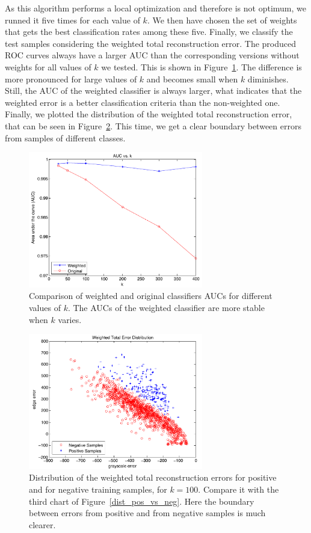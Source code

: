 \documentclass[10pt, conference, compsocconf]{IEEEtran}
\begin{document}
As this algorithm performs a local optimization and therefore is not optimum, we runned it five times for each value of $k$. We then have chosen the set of weights that gets the best classification rates among these five. Finally, we classify the test samples considering the weighted total reconstruction error. The produced ROC curves always have a larger AUC than the corresponding versions without weights for all values of $k$ we tested. This is shown in Figure~\ref{auc_vs_k}. The difference is more pronounced for large values of $k$ and becomes small when $k$ diminishes. Still, the AUC of the weighted classifier is always larger, what indicates that the weighted error is a better classification criteria than the non-weighted one. Finally, we plotted the distribution of the weighted total reconstruction error, that can be seen in Figure~\ref{dist_weighted}. This time, we get a clear boundary between errors from samples of different classes.

\begin{figure}[t]
\centering
\includegraphics[width=3in]{chart_auc_vs_k}
\caption{Comparison of weighted and original classifiers AUCs for different values of $k$. The AUCs of the weighted classifier are more stable when $k$ varies.}
\label{auc_vs_k}
\end{figure}

\begin{figure}[t]
\centering
\includegraphics[width=3in]{dist_gray_vs_edge_weighted}
\caption{Distribution of the weighted total reconstruction errors for positive and for negative training samples, for $k=100$. Compare it with the third chart of Figure~\ref{dist_pos_vs_neg}. Here the boundary between errors from positive and from negative samples is much clearer.}
\label{dist_weighted}
\end{figure}
\end{document}
